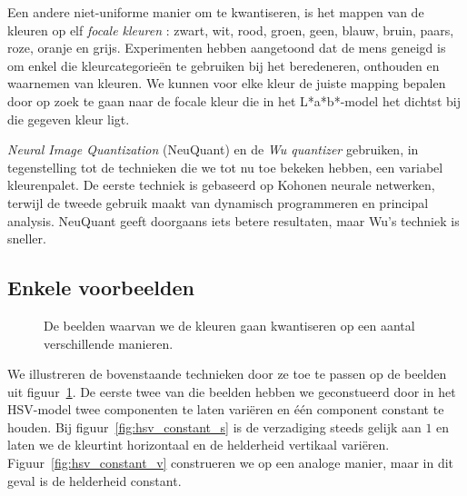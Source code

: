 Een andere niet-uniforme manier om te kwantiseren, is het mappen van de kleuren op elf 
\emph{focale kleuren} \cite{van_den_broek:human_color_categorization_for_cbir}: zwart, wit, rood, groen, geen, blauw, bruin, paars, roze, oranje en grijs.
Experimenten hebben aangetoond dat de mens geneigd is om enkel die kleurcategorie\"en te gebruiken bij 
het beredeneren, onthouden en waarnemen van kleuren. We kunnen voor elke kleur de juiste mapping bepalen
door op zoek te gaan naar de focale kleur die in het L*a*b*-model het dichtst bij die gegeven kleur ligt.

\emph{Neural Image Quantization} (NeuQuant) \cite{dekker:neuquant} en de \emph{Wu quantizer} 
\cite{wu:color_quantization_by_dynamic_programming_and_principal_analysis} 
gebruiken, in tegenstelling tot de technieken die we 
tot nu toe bekeken hebben, een variabel kleurenpalet. De eerste techniek is gebaseerd op
Kohonen neurale netwerken, terwijl de tweede gebruik maakt van dynamisch programmeren
en principal analysis. NeuQuant geeft doorgaans iets betere resultaten, maar Wu's techniek is
sneller.

\subsection{Enkele voorbeelden}

\begin{figure}[tbp]
\begin{center}
\caption{\label{fig:kwantistatie_originelen}De beelden waarvan we de kleuren gaan kwantiseren op een aantal verschillende manieren.}
\end{center}
\end{figure}

We illustreren de bovenstaande technieken door ze toe te passen op de beelden uit 
figuur~\ref{fig:kwantistatie_originelen}. De eerste twee van die beelden hebben we geconstueerd
door in het HSV-model twee componenten te laten vari\"eren en \'e\'en component constant te houden.
Bij figuur~\ref{fig:hsv_constant_s} is de verzadiging steeds gelijk aan $1$ en laten we de kleurtint 
horizontaal en de helderheid vertikaal vari\"eren. Figuur~\ref{fig:hsv_constant_v} construeren we
op een analoge manier, maar in dit geval is de helderheid constant.

